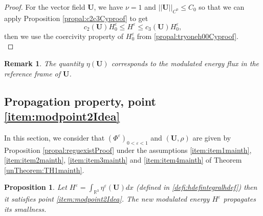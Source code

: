\documentclass[a4paper, 15pt]{article}
\numberwithin{equation}{section}
\newtheorem{propal}[defi]{Proposition}
\newtheorem{rem}[defi]{Remark}
\begin{document}
\begin{proof}
    For the vector field $\textbf{U}$, we have $\nu=1$ and $||\textbf{U}||_{C^0}\leq C_0$ so that we can apply Proposition \ref{propal:c2c3Cyproof} to get 
    \begin{equation}
		c_2(\textbf{U})H^\varepsilon_{0} \leq H^\varepsilon\leq c_3(\textbf{U})H^\varepsilon_{0},
\end{equation}
then we use the coercivity property of $H^\varepsilon_0$ from \ref{propal:tryoneh00Cyproof}.\\
\end{proof}
\begin{rem}
\label{rem:shiftedframeCyproof}
The quantity $\eta(\textbf{U})$ corresponds to the modulated energy flux in the reference frame of $\textbf{U}$.
\end{rem}
\subsection{\textbf{Propagation property}, point \ref{item:modpoint2Idea}}
\label{subsection:Pgproof}
In this section, we consider that $(\Phi^\varepsilon)_{0<\varepsilon<1}$ and $(\textbf{U},\rho)$ are given by Proposition \ref{propal:reguexistProof} under the assumptions \ref{item:item1mainth}, \ref{item:item2mainth}, \ref{item:item3mainth} and \ref{item:item4mainth} of Theorem \ref{unTheorem:TH1mainth}.\\
\begin{propal}
\label{propal:finalPgproof}
 Let $H^\varepsilon=\int_{\mathbb{R}^3}{\eta^\varepsilon(\textbf{U})dx}$ (defined in \ref{defi:hdefintegralhdef}) then it satisfies point \ref{item:modpoint2Idea}. The new modulated energy $H^\varepsilon$ propagates its smallness. 
\end{propal}
\end{document}
